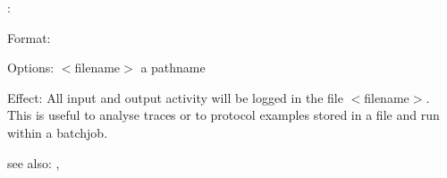 \script:

Format: 

Options: $<$filename$>$ a pathname

Effect: All input and output activity will be logged in the file
        $<$filename$>$. This is useful to analyse traces or to protocol
        examples stored in a file and run within a batchjob.

see also: \EndScript, \exec
